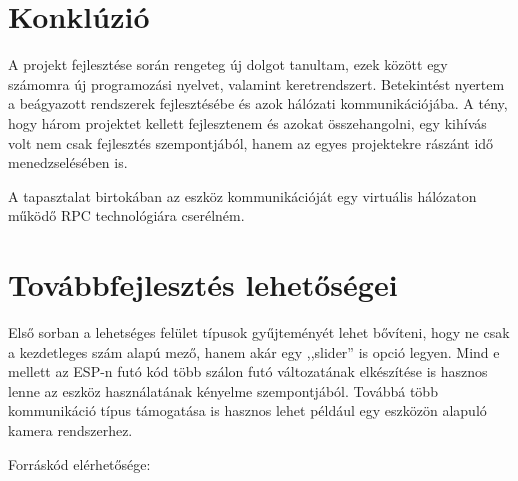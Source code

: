 \documentclass{thesis-ekf}
\theoremstyle{definition}
\theoremstyle{remark}
\begin{document}
	\section*{Konklúzió}
	A projekt fejlesztése során rengeteg új dolgot tanultam, ezek között egy számomra új programozási nyelvet, valamint keretrendszert. Betekintést nyertem a beágyazott rendszerek fejlesztésébe és azok hálózati kommunikációjába. A tény, hogy három projektet kellett fejlesztenem és azokat összehangolni, egy kihívás volt nem csak fejlesztés szempontjából, hanem az egyes projektekre rászánt idő menedzselésében is.
	
	A tapasztalat birtokában az eszköz kommunikációját egy virtuális hálózaton működő RPC technológiára cserélném.
	\section*{Továbbfejlesztés lehetőségei}
	
	Első sorban a lehetséges felület típusok gyűjteményét lehet bővíteni, hogy ne csak a kezdetleges szám alapú mező, hanem akár egy ,,slider'' is opció legyen. Mind e mellett az ESP-n futó kód több szálon futó változatának elkészítése is hasznos lenne az eszköz használatának kényelme szempontjából. Továbbá több kommunikáció típus támogatása is hasznos lehet például egy eszközön alapuló kamera rendszerhez.
	\begin{center}
		Forráskód elérhetősége:\\
		{}
	\end{center}
	
\end{document}
